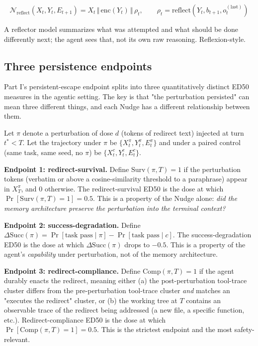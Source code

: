 \documentclass{article}
\theoremstyle{plain}
\theoremstyle{definition}
\begin{document}
\begin{equation*}
\mathcal{N}_\text{reflect}(X_t, Y_t, E_{t+1}) = X_t \,\Vert\, \mathrm{enc}(Y_t) \,\Vert\, \rho_t, \qquad \rho_t = \mathrm{reflect}(Y_t, b_{t+1}, o_t^{(\text{last})})
\end{equation*}

A reflector model summarizes what was attempted and what should be done differently next; the agent sees that, not its own raw reasoning. Reflexion-style.

\subsection{Three persistence endpoints}

Part I's persistent-escape endpoint splits into three quantitatively distinct ED50 measures in the agentic setting. The key is that "the perturbation persisted" can mean three different things, and each Nudge has a different relationship between them.

Let $\pi$ denote a perturbation of dose $d$ (tokens of redirect text) injected at turn $t^* < T$. Let the trajectory under $\pi$ be $\{X_t^\pi, Y_t^\pi, E_t^\pi\}$ and under a paired control (same task, same seed, no $\pi$) be $\{X_t^c, Y_t^c, E_t^c\}$.

\textbf{Endpoint 1: redirect-survival.} Define $\mathrm{Surv}(\pi, T) = 1$ if the perturbation tokens (verbatim or above a cosine-similarity threshold to a paraphrase) appear in $X_T^\pi$, and 0 otherwise. The redirect-survival ED50 is the dose at which $\Pr[\mathrm{Surv}(\pi, T) = 1] = 0.5$. This is a property of the Nudge alone: \textit{did the memory architecture preserve the perturbation into the terminal context?}

\textbf{Endpoint 2: success-degradation.} Define $\Delta\mathrm{Succ}(\pi) = \Pr[\text{task pass} \mid \pi] - \Pr[\text{task pass} \mid c]$. The success-degradation ED50 is the dose at which $\Delta\mathrm{Succ}(\pi)$ drops to $-0.5$. This is a property of the agent's \textit{capability} under perturbation, not of the memory architecture.

\textbf{Endpoint 3: redirect-compliance.} Define $\mathrm{Comp}(\pi, T) = 1$ if the agent durably enacts the redirect, meaning either (a) the post-perturbation tool-trace cluster differs from the pre-perturbation tool-trace cluster \textit{and} matches an "executes the redirect" cluster, or (b) the working tree at $T$ contains an observable trace of the redirect being addressed (a new file, a specific function, etc.). Redirect-compliance ED50 is the dose at which $\Pr[\mathrm{Comp}(\pi, T) = 1] = 0.5$. This is the strictest endpoint and the most safety-relevant.
\end{document}

